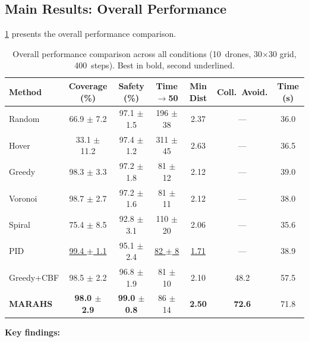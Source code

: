 \documentclass[11pt,twocolumn]{article}
\providecommand{\Cref}[1]{\ref{#1}}
\theoremstyle{definition}
\begin{document}
\subsection{Main Results: Overall Performance}
\label{sec:main_results}

\Cref{tab:main_results} presents the overall performance comparison.

\begin{table}[t]
\centering
\caption{Overall performance comparison across all conditions (10~drones, 30$\times$30 grid, 400~steps). Best in bold, second underlined.}
\label{tab:main_results}
\begin{tabular}{lcccccc}
\toprule
\textbf{Method} & \textbf{Coverage (\%)} & \textbf{Safety (\%)} & \textbf{Time$\to$50} & \textbf{Min Dist} & \textbf{Coll.\ Avoid.} & \textbf{Time (s)} \\
\midrule
Random         & 66.9 $\pm$ 7.2  & 97.1 $\pm$ 1.5  & 196 $\pm$ 38  & 2.37 & ---     & 36.0 \\
Hover          & 33.1 $\pm$ 11.2 & 97.4 $\pm$ 1.2  & 311 $\pm$ 45  & 2.63 & ---     & 36.5 \\
Greedy         & 98.3 $\pm$ 3.3  & 97.2 $\pm$ 1.8  & 81 $\pm$ 12   & 2.12 & ---     & 39.0 \\
Voronoi        & 98.7 $\pm$ 2.7  & 97.2 $\pm$ 1.6  & 81 $\pm$ 11   & 2.12 & ---     & 38.0 \\
Spiral         & 75.4 $\pm$ 8.5  & 92.8 $\pm$ 3.1  & 110 $\pm$ 20  & 2.06 & ---     & 35.6 \\
PID            & \underline{99.4 $\pm$ 1.1} & 95.1 $\pm$ 2.4  & \underline{82 $\pm$ 8}   & \underline{1.71} & ---     & 38.9 \\
Greedy+CBF     & 98.5 $\pm$ 2.2  & 96.8 $\pm$ 1.9  & 81 $\pm$ 10   & 2.10 & 48.2    & 57.5 \\
\midrule
\textbf{MARAHS} & \textbf{98.0 $\pm$ 2.9} & \textbf{99.0 $\pm$ 0.8} & 86 $\pm$ 14   & \textbf{2.50} & \textbf{72.6} & 71.8 \\
\bottomrule
\end{tabular}
\end{table}

\textbf{Key findings:}
\end{document}
